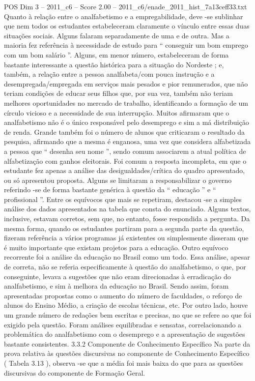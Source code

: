 \begin{textsample}{POS Dim 3 – 2011\_c6 – Score 2.00 – 2011\_c6/enade\_2011\_hist\_7a13ceff33.txt}
Quanto à relação entre o analfabetismo e a empregabilidade, deve -se sublinhar que nem todos os estudantes estabeleceram claramente o vínculo entre essas duas situações sociais.
Alguns falaram separadamente de uma e de outra.
Mas a maioria fez referência à necessidade de estudo para “ conseguir um bom emprego com um bom salário ”.
Alguns, em menor número, estabeleceram de forma bastante interessante a questão histórica para a situação do Nordeste ; e, também, a relação entre a pessoa analfabeta/com pouca instrução e a desempregada/empregada em serviços mais pesados e pior remunerados, que não teriam condições de educar seus filhos que, por sua vez, também não teriam melhores oportunidades no mercado de trabalho, identificando a formação de um círculo vicioso e a necessidade de sua interrupção.
Muitos afirmaram que o analfabetismo não é o único responsável pelo desemprego e sim a má distribuição de renda.
Grande também foi o número de alunos que criticaram o resultado da pesquisa, afirmando que a mesma é enganosa, uma vez que considera alfabetizada a pessoa que “ desenha seu nome ”, sendo comum associarem a atual política de alfabetização com ganhos eleitorais.
Foi comum a resposta incompleta, em que o estudante fez apenas a análise das desigualdades/crítica do quadro apresentado, ou só apresentou proposta.
Alguns se limitaram a responsabilizar o governo referindo -se de forma bastante genérica à questão da “ educação ” e “ profissional ”.
Entre os equívocos que mais se repetiram, destacou -se a simples análise dos dados apresentados na tabela que consta do enunciado.
Alguns textos, inclusive, estavam corretos, sem que, no entanto, fosse respondida a pergunta.
Da mesma forma, quando os estudantes partiram para a segunda parte da questão, fizeram referência a vários programas já existentes ou simplesmente disseram que é muito importante que existam projetos para a educação.
Outro equívoco recorrente foi a análise da educação no Brasil como um todo.
Essa análise, apesar de correta, não se referia especificamente à questão do analfabetismo, o que, por conseguinte, levava a sugestões que não eram direcionadas à erradicação do analfabetismo, e sim à melhora da educação no Brasil.
Sendo assim, foram apresentadas propostas como o aumento do número de faculdades, o reforço de alunos do Ensino Médio, a criação de escolas técnicas, etc.
Por outro lado, houve um grande número de redações bem escritas e precisas, no que se refere ao que foi exigido pela questão.
Foram análises equilibradas e sensatas, correlacionando a problemática do analfabetismo com o desemprego e a apresentação de sugestões bastante consistentes. 3.3.2 Componente de Conhecimento Específico Na parte da prova relativa às questões discursivas no componente de Conhecimento Específico ( Tabela 3.13 ), observa -se que a média foi mais baixa do que para as questões discursivas do componente de Formação Geral.

\end{textsample}
